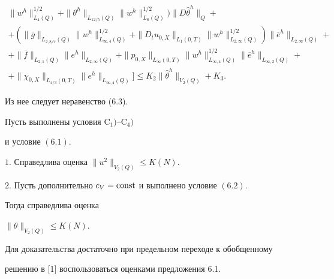 \begin{pf}
\begin{multline*}
\|w^h\|^{1/2}_{L_4(Q)}+


\|\theta^h\|_{L_{12/5}(Q)}\|w^h\|_{L_6(Q)}^{1/2})\|D\widehat\theta^h\|_Q+\\


+(\|\overline g\|_{L_{2,8/7}(Q)}\|w^h\|^{1/2}_{L_{\infty,4}(Q)}


+\|D_tu_{0,X}\|_{L_1(0,T)}\|w^h\|^{1/2}_{L_{2,\infty}(Q)})


\|\overline e^h\|_{L_{2,\infty}(Q)}+\\


+\|\overline f\|_{L_{2,1}(Q)}\|e^h\|_{L_{2,\infty}(Q)}+


\|p_{0,X}\|_{L_{\infty}(0,T)}\|w^h\|^{1/2}_{L_{\infty,4}(Q)}


\|\overline e^h\|_{L_{\infty,2}(Q)}+\\


+\|\chi_{0,X}\|_{L_{4/3}(0,T)}\|e^h\|_{L_{\infty,4}(Q)}\big]\le


K_2\|\widehat\theta^h\|_{V_2(Q)}+K_3.


\end{multline*}


Из нее следует неравенство (6.3).


\end{pf}





\begin{props}


Пусть выполнены условия $\mathrm C_1)$--$\mathrm C_4)$


и условие $(6.1)$.





$1.$ Справедлива оценка $\|u^2\|_{V_2(Q)}\le K(N)$.





$2.$ Пусть дополнительно $c_V=\operatorname{const}$ и выполнено условие $(6.2)$.


Тогда справедлива оценка


$\|\theta\|_{V_2(Q)}\le K(N)$.


\end{props}





Для доказательства достаточно при предельном переходе к обобщенному


решению в [1] воспользоваться оценками предложения 6.1.








